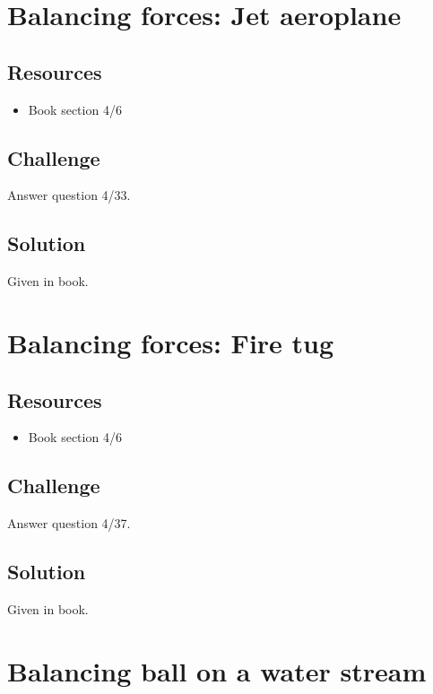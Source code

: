 \newpage
\section{Balancing forces: Jet aeroplane}

\subsection*{Resources}
\begin{itemize}
    \item Book section 4/6
\end{itemize}

\subsection*{Challenge}
Answer question 4/33.

\subsection*{Solution}
Given in book.



\newpage
\section{Balancing forces: Fire tug}

\subsection*{Resources}
\begin{itemize}
    \item Book section 4/6
\end{itemize}

\subsection*{Challenge}
Answer question 4/37.

\subsection*{Solution}
Given in book.




\newpage
\section{Balancing ball on a water stream}

